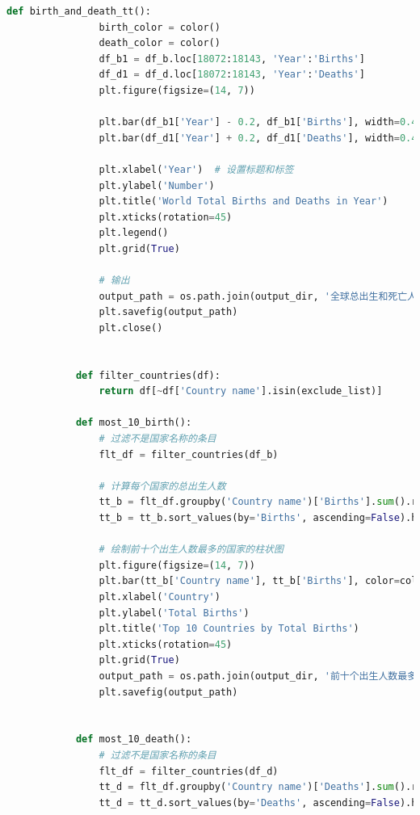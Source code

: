 \documentclass{ctexart}
\begin{document}
\begin{lstlisting}[language=Python]
            def birth_and_death_tt():
                birth_color = color()
                death_color = color()
                df_b1 = df_b.loc[18072:18143, 'Year':'Births']
                df_d1 = df_d.loc[18072:18143, 'Year':'Deaths']
                plt.figure(figsize=(14, 7))

                plt.bar(df_b1['Year'] - 0.2, df_b1['Births'], width=0.4, color=birth_color, align='center', label='Births')
                plt.bar(df_d1['Year'] + 0.2, df_d1['Deaths'], width=0.4, color=death_color, align='center', label='Deaths')

                plt.xlabel('Year')  # 设置标题和标签
                plt.ylabel('Number')
                plt.title('World Total Births and Deaths in Year')
                plt.xticks(rotation=45)
                plt.legend()
                plt.grid(True)

                # 输出
                output_path = os.path.join(output_dir, '全球总出生和死亡人数的柱状图.png')
                plt.savefig(output_path)
                plt.close()


            def filter_countries(df):
                return df[~df['Country name'].isin(exclude_list)]

            def most_10_birth():
                # 过滤不是国家名称的条目
                flt_df = filter_countries(df_b)
                
                # 计算每个国家的总出生人数
                tt_b = flt_df.groupby('Country name')['Births'].sum().reset_index()
                tt_b = tt_b.sort_values(by='Births', ascending=False).head(10)

                # 绘制前十个出生人数最多的国家的柱状图
                plt.figure(figsize=(14, 7))
                plt.bar(tt_b['Country name'], tt_b['Births'], color=color())
                plt.xlabel('Country')
                plt.ylabel('Total Births')
                plt.title('Top 10 Countries by Total Births')
                plt.xticks(rotation=45)
                plt.grid(True)
                output_path = os.path.join(output_dir, '前十个出生人数最多的国家的柱状图.png')
                plt.savefig(output_path)


            def most_10_death():
                # 过滤不是国家名称的条目
                flt_df = filter_countries(df_d)
                tt_d = flt_df.groupby('Country name')['Deaths'].sum().reset_index()
                tt_d = tt_d.sort_values(by='Deaths', ascending=False).head(10)


\end{lstlisting}
\end{document}
